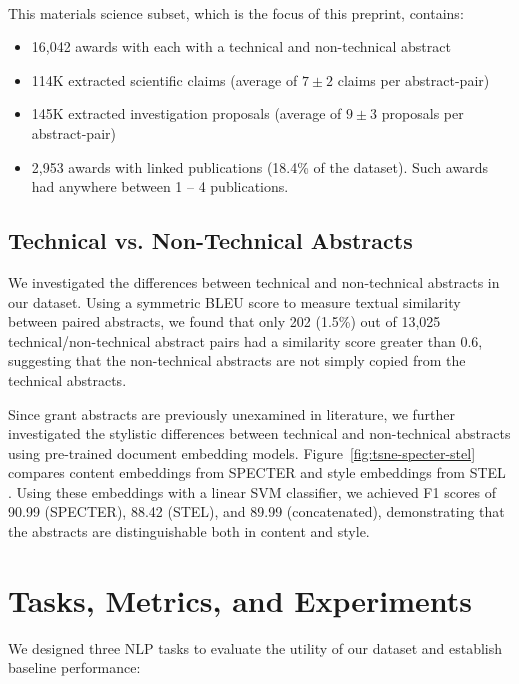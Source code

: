 \documentclass[11pt]{article}
\begin{document}
\paragraph{\DatasetNameMatSci} This materials science subset, which is the focus of this preprint, contains:
\begin{itemize}[noitemsep,topsep=0pt]
\item 16,042 awards with each with a technical and non-technical abstract
\item 114K extracted scientific claims (average of $7\pm2$ claims per abstract-pair)
\item 145K extracted investigation proposals (average of $9\pm3$ proposals per abstract-pair)
\item 2,953 awards with linked publications (18.4\% of the dataset). Such awards had anywhere between 1 -- 4 publications.
\end{itemize}

\subsection{Technical vs. Non-Technical Abstracts}
We investigated the differences between technical and non-technical abstracts in our dataset. Using a symmetric BLEU score to measure textual similarity between paired abstracts, we found that only 202 (1.5\%) out of 13,025 technical/non-technical abstract pairs had a similarity score greater than 0.6, suggesting that the non-technical abstracts are not simply copied from the technical abstracts.

Since grant abstracts are previously unexamined in literature, we further investigated the stylistic differences between technical and non-technical abstracts using pre-trained document embedding models. Figure~\ref{fig:tsne-specter-stel} compares content embeddings from SPECTER \cite{cohan-etal-2020-specter} and style embeddings from STEL \cite{patel2025}. Using these embeddings with a linear SVM classifier, we achieved F1 scores of 90.99 (SPECTER), 88.42 (STEL), and 89.99 (concatenated), demonstrating that the abstracts are distinguishable both in content and style.

\section{Tasks, Metrics, and Experiments}

We designed three NLP tasks to evaluate the utility of our dataset and establish baseline performance:
\end{document}
